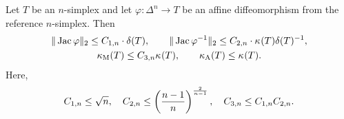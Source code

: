 \documentclass[10pt,letterpaper]{article}
\begin{document}
\begin{lemma}\label{lemma:measurerelationships}
    Let $T$ be an $n$-simplex and let $\varphi : \Delta^{n} \rightarrow T$ be an affine diffeomorphism from the reference $n$-simplex. Then 
    \begin{gather*}
        \matnorm{\Jacobian \varphi}
        \leq 
        \Ceins{n} \cdot \diam(T) %
        ,
        \qquad 
        \matnorm{ \Jacobian \varphi^{-1} }
        \leq 
        \Czwei{n} \cdot 
        \geometricshapemeasure(T) 
        \diam(T)^{-1}
        ,
        \\
        \algebraicshapemeasure(T)
        \leq 
        \Cdrei{n}
        \geometricshapemeasure(T)
        ,
        \qquad 
        \aspectratio(T)
        \leq 
        \geometricshapemeasure(T)
        .
    \end{gather*}
    Here,
    \begin{align*}
        \Ceins{n} \leq \sqrt{n},
        \quad 
        \Czwei{n} \leq          \left( \frac{n-1}{n} \right)^{\frac{2}{n-1}}, 
        \quad 
        \Cdrei{n} \leq \Ceins{n}\Czwei{n} %
        . 
    \end{align*}
\end{lemma}
\end{document}
